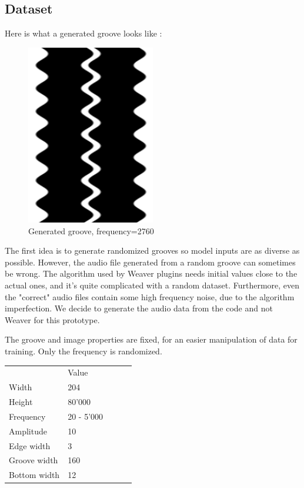 \documentclass[12pt, twoside]{article}
\begin{document}
\subsection{Dataset}
Here is what a generated groove looks like :
\begin{figure}[H]
	\centering
	\includegraphics[width=0.5\textwidth]{../images/example_groove.png}
	\caption{Generated groove, frequency=2760}
	\label{gengroove}
\end{figure}
The first idea is to generate randomized grooves so model inputs are as diverse as possible. However, the audio file generated from a random groove can sometimes be wrong. The algorithm used by Weaver plugins needs initial values close to the actual ones, and it's quite complicated with a random dataset. Furthermore, even the "correct" audio files contain some high frequency noise, due to the algorithm imperfection. We decide to generate the audio data from the code and not Weaver for this prototype.

The groove and image properties are fixed, for an easier manipulation of data for training. Only the frequency is randomized.
\begin{table}[]
	\begin{tabular}{lllll}
		& Value      &  &  &  \\
		Width        & 204        &  &  &  \\
		Height       & 80'000     &  &  &  \\
		Frequency    & 20 - 5'000 &  &  &  \\
		Amplitude    & 10         &  &  &  \\
		Edge width   & 3          &  &  &  \\
		Groove width & 160        &  &  &  \\
		Bottom width & 12         &  &  & 
	\end{tabular}
\end{table}
\end{document}

